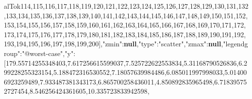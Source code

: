 \documentclass[
  10pt,
  a4paper,
,tablecaptionabove
]{scrartcl}
\newenvironment{Shaded}{}{}
\newcommand{\DataTypeTok}[1]{\textcolor[rgb]{0.56,0.13,0.00}{#1}}
\newcommand{\DecValTok}[1]{\textcolor[rgb]{0.25,0.63,0.44}{#1}}
\newcommand{\FloatTok}[1]{\textcolor[rgb]{0.25,0.63,0.44}{#1}}
\newcommand{\FunctionTok}[1]{\textcolor[rgb]{0.02,0.16,0.49}{#1}}
\newcommand{\KeywordTok}[1]{\textcolor[rgb]{0.00,0.44,0.13}{\textbf{#1}}}
\newcommand{\OtherTok}[1]{\textcolor[rgb]{0.00,0.44,0.13}{#1}}
\newcommand{\StringTok}[1]{\textcolor[rgb]{0.25,0.44,0.63}{#1}}
\begin{document}
\begin{Shaded}
\begin{Highlighting}[]
alTok{114}\OtherTok{,}\DecValTok{115}\OtherTok{,}\DecValTok{116}\OtherTok{,}\DecValTok{117}\OtherTok{,}\DecValTok{118}\OtherTok{,}\DecValTok{119}\OtherTok{,}\DecValTok{120}\OtherTok{,}\DecValTok{121}\OtherTok{,}\DecValTok{122}\OtherTok{,}\DecValTok{123}\OtherTok{,}\DecValTok{124}\OtherTok{,}\DecValTok{125}\OtherTok{,}\DecValTok{126}\OtherTok{,}\DecValTok{127}\OtherTok{,}\DecValTok{128}\OtherTok{,}\DecValTok{129}\OtherTok{,}\DecValTok{130}\OtherTok{,}\DecValTok{131}\OtherTok{,}\DecValTok{132}\OtherTok{,}\DecValTok{133}\OtherTok{,}\DecValTok{134}\OtherTok{,}\DecValTok{135}\OtherTok{,}\DecValTok{136}\OtherTok{,}\DecValTok{137}\OtherTok{,}\DecValTok{138}\OtherTok{,}\DecValTok{139}\OtherTok{,}\DecValTok{140}\OtherTok{,}\DecValTok{141}\OtherTok{,}\DecValTok{142}\OtherTok{,}\DecValTok{143}\OtherTok{,}\DecValTok{144}\OtherTok{,}\DecValTok{145}\OtherTok{,}\DecValTok{146}\OtherTok{,}\DecValTok{147}\OtherTok{,}\DecValTok{148}\OtherTok{,}\DecValTok{149}\OtherTok{,}\DecValTok{150}\OtherTok{,}\DecValTok{151}\OtherTok{,}\DecValTok{152}\OtherTok{,}\DecValTok{153}\OtherTok{,}\DecValTok{154}\OtherTok{,}\DecValTok{155}\OtherTok{,}\DecValTok{156}\OtherTok{,}\DecValTok{157}\OtherTok{,}\DecValTok{158}\OtherTok{,}\DecValTok{159}\OtherTok{,}\DecValTok{160}\OtherTok{,}\DecValTok{161}\OtherTok{,}\DecValTok{162}\OtherTok{,}\DecValTok{163}\OtherTok{,}\DecValTok{164}\OtherTok{,}\DecValTok{165}\OtherTok{,}\DecValTok{166}\OtherTok{,}\DecValTok{167}\OtherTok{,}\DecValTok{168}\OtherTok{,}\DecValTok{169}\OtherTok{,}\DecValTok{170}\OtherTok{,}\DecValTok{171}\OtherTok{,}\DecValTok{172}\OtherTok{,}\DecValTok{173}\OtherTok{,}\DecValTok{174}\OtherTok{,}\DecValTok{175}\OtherTok{,}\DecValTok{176}\OtherTok{,}\DecValTok{177}\OtherTok{,}\DecValTok{178}\OtherTok{,}\DecValTok{179}\OtherTok{,}\DecValTok{180}\OtherTok{,}\DecValTok{181}\OtherTok{,}\DecValTok{182}\OtherTok{,}\DecValTok{183}\OtherTok{,}\DecValTok{184}\OtherTok{,}\DecValTok{185}\OtherTok{,}\DecValTok{186}\OtherTok{,}\DecValTok{187}\OtherTok{,}\DecValTok{188}\OtherTok{,}\DecValTok{189}\OtherTok{,}\DecValTok{190}\OtherTok{,}\DecValTok{191}\OtherTok{,}\DecValTok{192}\OtherTok{,}\DecValTok{193}\OtherTok{,}\DecValTok{194}\OtherTok{,}\DecValTok{195}\OtherTok{,}\DecValTok{196}\OtherTok{,}\DecValTok{197}\OtherTok{,}\DecValTok{198}\OtherTok{,}\DecValTok{199}\OtherTok{,}\DecValTok{200}\OtherTok{]}\FunctionTok{,}\DataTypeTok{"zmin"}\FunctionTok{:}\KeywordTok{null}\FunctionTok{,}\DataTypeTok{"type"}\FunctionTok{:}\StringTok{"scatter"}\FunctionTok{,}\DataTypeTok{"zmax"}\FunctionTok{:}\KeywordTok{null}\FunctionTok{,}\DataTypeTok{"legendgroup"}\FunctionTok{:}\StringTok{"@worst{-}case"}\FunctionTok{,}\DataTypeTok{"y"}\FunctionTok{:}\OtherTok{[}\FloatTok{179.55714255348403}\OtherTok{,}\FloatTok{7.617256615599037}\OtherTok{,}\FloatTok{7.525722622553834}\OtherTok{,}\FloatTok{5.31168790526836}\OtherTok{,}\FloatTok{6.299228255323154}\OtherTok{,}\FloatTok{5.188472316530552}\OtherTok{,}\FloatTok{7.18057639984486}\OtherTok{,}\FloatTok{6.085011997998033}\OtherTok{,}\FloatTok{5.014006923259489}\OtherTok{,}\FloatTok{7.933487381343173}\OtherTok{,}\FloatTok{6.865700258436011}\OtherTok{,}\FloatTok{4.850892835965498}\OtherTok{,}\FloatTok{6.718395752727454}\OtherTok{,}\FloatTok{8.546256424361605}\OtherTok{,}\FloatTok{10.335723833942598}\OtherTok{,}\Float
\end{Highlighting}
\end{Shaded}
\end{document}
